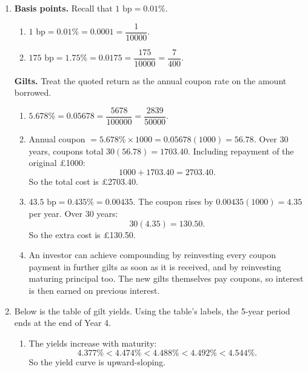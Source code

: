 \documentclass[12pt]{article}
\begin{document}
\bigskip

\begin{enumerate}[label=\textbf{Q\arabic*.}, start=4]

\item
\textbf{Basis points.} Recall that \(1\text{ bp}=0.01\%\).

\begin{enumerate}[label=(\alph*)]
\item 
\(1\text{ bp}=0.01\%=0.0001=\dfrac{1}{10000}\).

\item 
\(175\text{ bp}=1.75\%=0.0175=\dfrac{175}{10000}=\dfrac{7}{400}\).
\end{enumerate}

\medskip
\textbf{Gilts.} Treat the quoted return as the annual coupon rate on the amount borrowed.

\begin{enumerate}[label=(\alph*), start=3]
\item 
\(5.678\%=0.05678=\dfrac{5678}{100000}=\dfrac{2839}{50000}\).

\item 
Annual coupon \(=5.678\%\times1000=0.05678(1000)=56.78\).
Over 30 years, coupons total \(30(56.78)=1703.40\). Including repayment of the original \pounds1000:
\[
1000+1703.40=2703.40.
\]
So the total cost is \pounds 2703.40.

\item 
\(43.5\text{ bp}=0.435\%=0.00435\).
The coupon rises by \(0.00435(1000)=4.35\) per year.
Over 30 years:
\[
30(4.35)=130.50.
\]
So the extra cost is \pounds 130.50.

\item 
An investor can achieve compounding by reinvesting every coupon payment in further gilts as soon as it is received, and by reinvesting maturing principal too. The new gilts themselves pay coupons, so interest is then earned on previous interest.
\end{enumerate}

\newpage

\item Below is the table of gilt yields. Using the table's labels, the 5-year period ends at the end of Year 4.

\begin{enumerate}[label=(\alph*)]
\item 
The yields increase with maturity:
\[
4.377\%<4.474\%<4.488\%<4.492\%<4.544\%.
\]
So the yield curve is upward-sloping.


\end{enumerate}
\end{enumerate}
\end{document}
